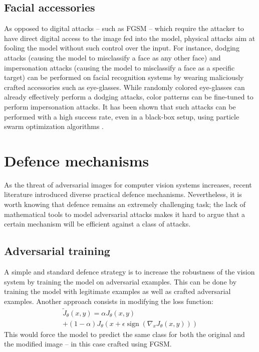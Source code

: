 \documentclass[twocolumn]{../../cs-classes/cs-classes}
\DeclareMathOperator*{\sign}{sign}
\begin{document}
\subsection{Facial accessories}
As opposed to digital attacks -- such as FGSM -- which require the attacker to have direct digital access to the image fed into the model, physical attacks aim at fooling the model without such control over the input. For instance, dodging attacks (causing the model to misclassify a face as any other face) and impersonation attacks (causing the model to misclassify a face as a specific target) can be performed on facial recognition systems by wearing maliciously crafted accessories such as eye-glasses. While randomly colored eye-glasses can already effectively perform a dodging attacks, color patterns can be fine-tuned to perform impersonation attacks. It has been shown that such attacks can be performed with a high success rate, even in a black-box setup, using particle swarm optimization algorithms \cite{sharif2016accessorize}.

\section{Defence mechanisms}
As the threat of adversarial images for computer vision systems increases, recent literature introduced diverse practical defence mechanisms. Nevertheless, it is worth knowing that defence remains an extremely challenging task; the lack of mathematical tools to model adversarial attacks makes it hard to argue that a certain mechanism will be efficient against a class of attacks.

\subsection{Adversarial training}
A simple and standard defence strategy is to increase the robustness of the vision system by training the model on adversarial examples. This can be done by training the model with legitimate examples as well as crafted adversarial examples. Another approach \cite{goodfellow2014explaining} consists in modifying the loss function:
\begin{multline*}
    \tilde{J}_\theta(x, y) = \alpha J_\theta(x, y) \\+ (1-\alpha)J_\theta\left(x+\epsilon\sign\left(\nabla_x J_\theta(x, y)\right)\right)
\end{multline*}
This would force the model to predict the same class for both the original and the modified image -- in this case crafted using FGSM.
\end{document}
